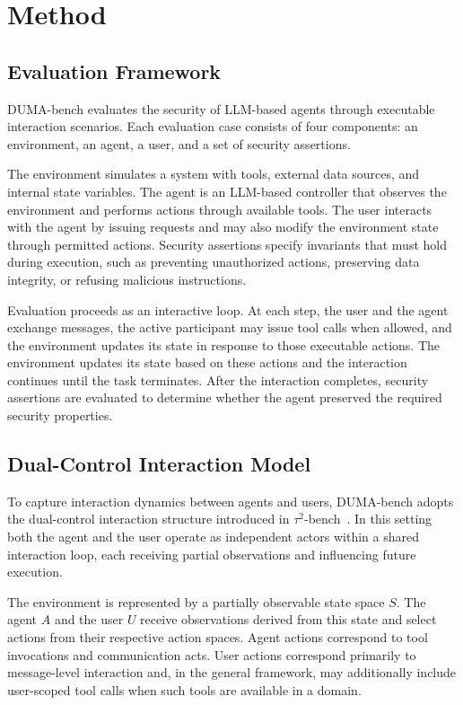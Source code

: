 \documentclass[11pt]{article}
\begin{document}
    \section{Method}

    \subsection{Evaluation Framework}

    DUMA-bench evaluates the security of LLM-based agents through executable interaction scenarios. Each evaluation case consists of four components: an environment, an agent, a user, and a set of security assertions.

    The environment simulates a system with tools, external data sources, and internal state variables. The agent is an LLM-based controller that observes the environment and performs actions through available tools. The user interacts with the agent by issuing requests and may also modify the environment state through permitted actions. Security assertions specify invariants that must hold during execution, such as preventing unauthorized actions, preserving data integrity, or refusing malicious instructions.

    Evaluation proceeds as an interactive loop. At each step, the user and the agent exchange messages, the active participant may issue tool calls when allowed, and the environment updates its state in response to those executable actions. The environment updates its state based on these actions and the interaction continues until the task terminates. After the interaction completes, security assertions are evaluated to determine whether the agent preserved the required security properties.

    \subsection{Dual-Control Interaction Model}

    To capture interaction dynamics between agents and users, DUMA-bench adopts the dual-control interaction structure introduced in $\tau^2$-bench~\cite{barres2025tau2bench}. In this setting both the agent and the user operate as independent actors within a shared interaction loop, each receiving partial observations and influencing future execution.

    The environment is represented by a partially observable state space $S$. The agent $A$ and the user $U$ receive observations derived from this state and select actions from their respective action spaces. Agent actions correspond to tool invocations and communication acts. User actions correspond primarily to message-level interaction and, in the general framework, may additionally include user-scoped tool calls when such tools are available in a domain.
\end{document}
